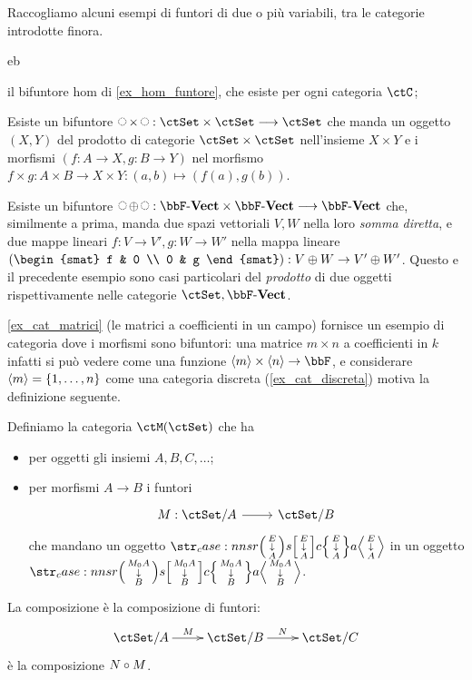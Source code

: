 \begin{examples}\label{exam_bifuntori}
	Raccogliamo alcuni esempi di funtori di due o più variabili, tra le categorie introdotte finora.
	\begin{enumtag}{eb}
		\item\label{eb_1} il bifuntore hom di \ref{ex_hom_funtore}, che esiste per ogni categoria \(\ctC\);
		\item\label{eb_2} Esiste un bifuntore \(\blank\times\blank : \ctSet\times\ctSet \fun\ctSet\) che manda un oggetto \((X,Y)\) del prodotto di categorie \(\ctSet\times\ctSet\) nell'insieme \(X\times Y\) e i morfismi \((f :A \to X, g : B\to Y)\) nel morfismo \(f\times g : A\times B \to X\times Y : (a,b)\mapsto (f(a),g(b))\).
		\item\label{eb_3} Esiste un bifuntore \(\blank\oplus\blank : \ctVect\times\ctVect \fun\ctVect\) che, similmente a prima, manda due spazi vettoriali \(V,W\) nella loro \emph{somma diretta}, e due mappe lineari \(f : V\to V',g : W\to W'\) nella mappa lineare \(\left(\begin{smat} f & 0 \\ 0 & g \end{smat}\right) : V\oplus W \to V'\oplus W'\). Questo e il precedente esempio sono casi particolari del \emph{prodotto} di due oggetti rispettivamente nelle categorie \(\ctSet,\ctVect\).
		\item\label{eb_4} \ref{ex_cat_matrici} (le matrici a coefficienti in un campo) fornisce un esempio di categoria dove i morfismi sono bifuntori: una matrice \(m\times n\) a coefficienti in \(k\) infatti si può vedere come una funzione \(\bkt m\times \bkt n \to \bbF\), e considerare \(\bkt m = \{\iter n\}\) come una categoria discreta (\ref{ex_cat_discreta}) motiva la definizione seguente.
	\end{enumtag}
\end{examples}
\begin{definition}
	Definiamo la categoria \(\ctM(\ctSet)\) che ha
	\begin{itemize}
		\item per oggetti gli insiemi \(A,B,C,\dots\);
		\item per morfismi \(A\to B\) i funtori
		      \[\dmFun M{\ctSet/A}{\ctSet/B}\]
		      che mandano un oggetto \(\var EA\) in un oggetto \(\var{M_0A}B\).
	\end{itemize}
	La composizione è la composizione di funtori:
	\[\xymatrix{
			\ctSet/A \ar[r]^M & \ctSet/B \ar[r]^N & \ctSet/C
		}\]
	è la composizione \(N\circ M\).
\end{definition}
